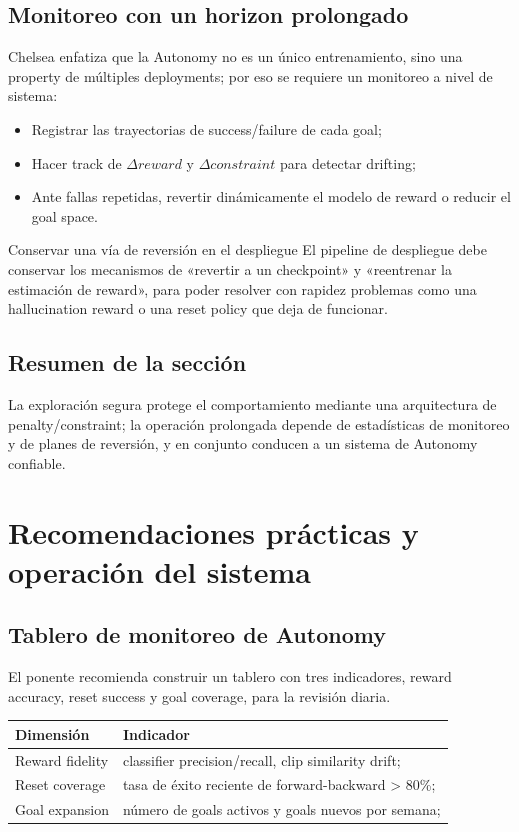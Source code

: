 \documentclass[a4paper]{article}
\begin{document}
\subsection{Monitoreo con un horizon prolongado}
Chelsea enfatiza que la Autonomy no es un único entrenamiento, sino una property de múltiples deployments; por eso se requiere un monitoreo a nivel de sistema:
\begin{itemize}
\item Registrar las trayectorias de success/failure de cada goal;
\item Hacer track de $\Delta reward$ y $\Delta constraint$ para detectar drifting;
\item Ante fallas repetidas, revertir dinámicamente el modelo de reward o reducir el goal space.
\end{itemize}

\begin{warningbox}{Conservar una vía de reversión en el despliegue}
El pipeline de despliegue debe conservar los mecanismos de «revertir a un checkpoint» y «reentrenar la estimación de reward», para poder resolver con rapidez problemas como una hallucination reward o una reset policy que deja de funcionar.
\end{warningbox}

\subsection{Resumen de la sección}
La exploración segura protege el comportamiento mediante una arquitectura de penalty/constraint; la operación prolongada depende de estadísticas de monitoreo y de planes de reversión, y en conjunto conducen a un sistema de Autonomy confiable.
\newpage
\section{Recomendaciones prácticas y operación del sistema}
\subsection{Tablero de monitoreo de Autonomy}
El ponente recomienda construir un tablero con tres indicadores, reward accuracy, reset success y goal coverage, para la revisión diaria.
\begin{tabularx}{\textwidth}{lX}
\toprule
Dimensión & Indicador \\
\midrule
Reward fidelity & classifier precision/recall, clip similarity drift; \\
Reset coverage & tasa de éxito reciente de forward-backward > 80\%; \\
Goal expansion & número de goals activos y goals nuevos por semana; \\
\bottomrule
\end{tabularx}
\end{document}
